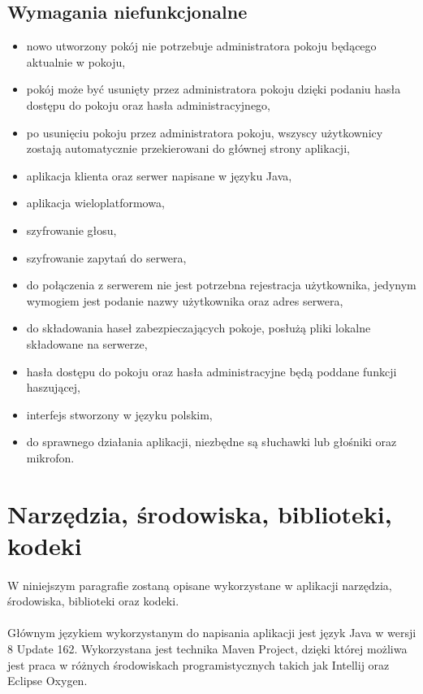 \documentclass[12pt,a4paper,notitlepage]{report}
\begin{document}
	\subsection{Wymagania niefunkcjonalne}
	\begin{itemize}
		\item nowo utworzony pokój nie potrzebuje administratora pokoju będącego aktualnie w pokoju,
		\item pokój może być usunięty przez administratora pokoju dzięki podaniu hasła dostępu do pokoju oraz hasła administracyjnego,
		\item po usunięciu pokoju przez administratora pokoju, wszyscy użytkownicy zostają automatycznie przekierowani do głównej strony aplikacji,
		\item aplikacja klienta oraz serwer napisane w języku Java,
		\item aplikacja wieloplatformowa,
		\item szyfrowanie głosu,
		\item szyfrowanie zapytań do serwera,
		\item do połączenia z serwerem nie jest potrzebna rejestracja użytkownika, jedynym wymogiem jest podanie nazwy użytkownika oraz adres serwera,
		\item do składowania haseł zabezpieczających pokoje, posłużą pliki lokalne składowane na serwerze,
		\item hasła dostępu do pokoju oraz hasła administracyjne będą poddane funkcji haszującej,
		\item interfejs stworzony w języku polskim,
		\item do sprawnego działania aplikacji, niezbędne są słuchawki lub głośniki oraz mikrofon.
	\end{itemize}
	\section{Narzędzia, środowiska, biblioteki, kodeki}
	\paragraph*{} W niniejszym paragrafie zostaną opisane wykorzystane w aplikacji narzędzia, środowiska, biblioteki oraz kodeki.
	\paragraph*{} Głównym językiem wykorzystanym do napisania aplikacji jest język Java w wersji 8 Update 162. Wykorzystana jest technika Maven Project, dzięki której możliwa jest praca w różnych środowiskach programistycznych takich jak Intellij oraz Eclipse Oxygen.
\end{document}
